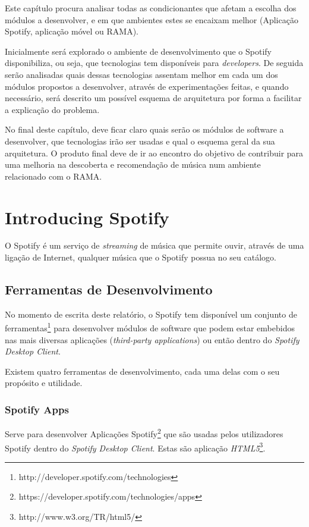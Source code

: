 Este capítulo procura analisar todas as condicionantes que afetam a escolha  dos módulos a desenvolver, e em que ambientes estes se encaixam melhor (Aplicação Spotify, aplicação móvel ou RAMA).

Inicialmente será explorado o ambiente de desenvolvimento que o Spotify disponibiliza, ou seja, que tecnologias tem disponíveis para \emph{developers}.
De seguida serão analisadas quais dessas tecnologias assentam melhor em cada um dos módulos propostos a desenvolver, através de experimentações feitas, e quando necessário, será descrito um possível esquema de arquitetura por forma a facilitar a explicação do problema.


No final deste capítulo, deve ficar claro quais serão os módulos de software a desenvolver, que tecnologias irão ser usadas e qual o esquema geral da sua arquitetura.
O produto final deve de ir ao encontro do objetivo de contribuir para uma melhoria na descoberta e recomendação de música num ambiente relacionado com o RAMA.


\section{Introducing Spotify} %
\label{sec:spotify}

  O Spotify é um serviço de \emph{streaming} de música que permite ouvir, através de uma ligação de Internet, qualquer música que o Spotify possua no seu catálogo.


  \subsection{Ferramentas de Desenvolvimento} %
  \label{sub:ferramentas_de_desenvolvimento}
  
    No momento de escrita deste relatório, o Spotify tem disponível um conjunto de ferramentas\footnote{http://developer.spotify.com/technologies} para desenvolver módulos de software que podem estar embebidos nas mais diversas aplicações (\emph{third-party applications}) ou então dentro do \emph{Spotify Desktop Client}.

    Existem quatro ferramentas de desenvolvimento, cada uma delas com o seu propósito e utilidade.


    \subsubsection{Spotify Apps} %
    \label{ssub:spotify_apps}
      Serve para desenvolver Aplicações Spotify\footnote{https://developer.spotify.com/technologies/apps} que são usadas pelos utilizadores Spotify dentro do \emph{Spotify Desktop Client}. Estas são aplicação \emph{HTML5}\footnote{http://www.w3.org/TR/html5/}.

